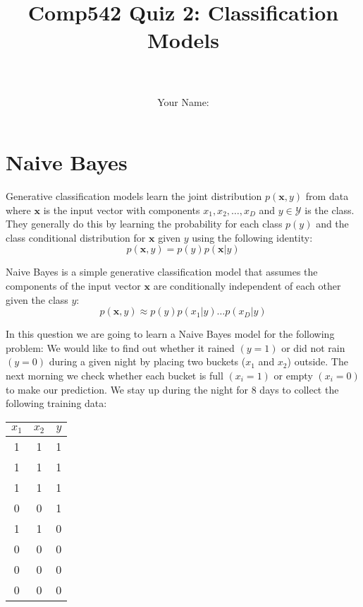 \documentclass[a4paper,fleqn]{article}
\title{Comp542 Quiz 2: Classification Models}
\author{\\ \\Your Name: \underline{\hspace*{10cm}}}
\renewcommand{\vec}{\mathbf}
\begin{document}
\maketitle
\newpage
\section{Naive Bayes}

Generative classification models learn the joint distribution
$p(\vec{x}, y)$ from data where $\vec{x}$ is the input vector with
components $x_1, x_2, \dots, x_D$ and $y\in\mathcal{Y}$ is the class.
They generally do this by learning the probability for each class
$p(y)$ and the class conditional distribution for $\vec{x}$ given $y$
using the following identity:
\[ p(\vec{x}, y) = p(y) p(\vec{x}|y) \]

Naive Bayes is a simple generative classification model that assumes
the components of the input vector $\vec{x}$ are conditionally
independent of each other given the class $y$:
\[ p(\vec{x}, y) \approx p(y) p(x_1|y) \dots p(x_D|y) \]

In this question we are going to learn a Naive Bayes model for the
following problem: We would like to find out whether it rained $(y=1)$
or did not rain $(y=0)$ during a given night by placing two buckets
($x_1$ and $x_2$) outside.  The next morning we check whether each
bucket is full $(x_i=1)$ or empty $(x_i=0)$ to make our prediction.
We stay up during the night for 8 days to collect the following
training data:

\begin{center}
\begin{tabular}{c|c|c}
$x_1$ & $x_2$ & $y$ \\ \hline
1 & 1 & 1 \\
1 & 1 & 1 \\
1 & 1 & 1 \\
0 & 0 & 1 \\
1 & 1 & 0 \\
0 & 0 & 0 \\
0 & 0 & 0 \\
0 & 0 & 0 \\
\end{tabular}
\end{center}
\end{document}
